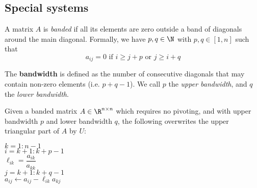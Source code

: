 \subsection{Special systems}\label{b9466fa}

\label{e385669}

A matrix $A$ is \textit{banded} if all its elements are zero outside a band of
diagonals around the main diagonal. Formally, we have $p,q\in\N$ with
$p,q\in[1,n]$ such that
$$
  a_{ij}=0 \text{ if } i\geq j+p \text{ or } j\geq i+q
$$

The \textbf{bandwidth} is defined as the number of consecutive diagonals that
may contain non-zero elements (i.e. $p+q-1$). We call $p$ the \textit{upper
bandwidth}, and $q$ the \textit{lower bandwidth}.

\label{a8ff951}

Given a banded matrix $A\in\R^{n\times n}$ which requires no pivoting, and with
upper bandwidth $p$ and lower bandwidth $q$, the following overwrites the upper
triangular part of $A$ by $U$:

\begin{pseudocode}
  \For $k=1:n-1$ \\
  \tab\For $i=k+1:k+p-1$ \\[0.5em]
  \tab\tab $\ell_{ik}=\dfrac{a_{ik}}{a_{kk}}$ \\[0.5em]
  \tab\tab\For $j=k+1:k+q-1$ \\
  \tab\tab\tab $a_{ij}\gets a_{ij}-\ell_{ik}a_{kj}$ \\
  \tab\tab\End \\
  \tab\End \\
  \End
\end{pseudocode}
